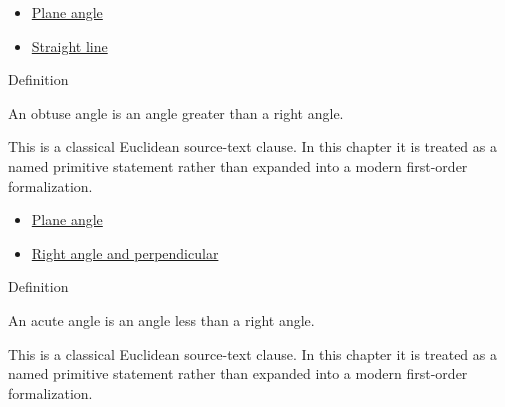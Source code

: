 \begin{lra-not-visible}
\begin{dependencies}
\begin{itemize}
  \item \hyperref[def:euclid-plane-angle]{Plane angle}
  \item \hyperref[def:euclid-straight-line]{Straight line}
\end{itemize}
\end{dependencies}
\end{lra-not-visible}

\begin{definitionbox}{Definition}
\begin{definition}
\label{def:euclid-obtuse-angle}
An obtuse angle is an angle greater than a right angle.
\end{definition}
\end{definitionbox}
\begin{remark*}
This is a classical Euclidean source-text clause. In this chapter it is treated
as a named primitive statement rather than expanded into a modern first-order
formalization.
\end{remark*}

\begin{lra-not-visible}
\begin{dependencies}
\begin{itemize}
  \item \hyperref[def:euclid-plane-angle]{Plane angle}
  \item \hyperref[def:euclid-right-angle-and-perpendicular]{Right angle and perpendicular}
\end{itemize}
\end{dependencies}
\end{lra-not-visible}

\begin{definitionbox}{Definition}
\begin{definition}
\label{def:euclid-acute-angle}
An acute angle is an angle less than a right angle.
\end{definition}
\end{definitionbox}
\begin{remark*}
This is a classical Euclidean source-text clause. In this chapter it is treated
as a named primitive statement rather than expanded into a modern first-order
formalization.
\end{remark*}

